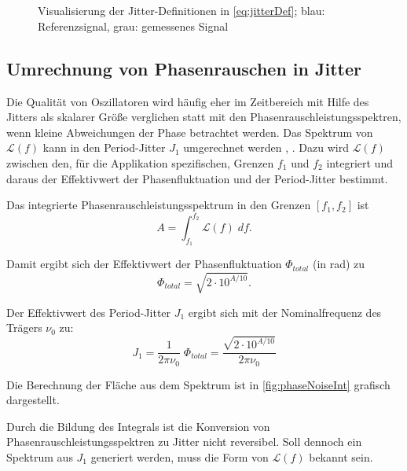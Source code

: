 \begin{figure}[H]
	\centering
	\\[4ex]
	\\[4ex]
	\caption[Jitterdefinitionen]{Visualisierung der Jitter-Definitionen in \autoref{eq:jitterDef}; blau: Referenzsignal, grau: gemessenes Signal}
	\label{fig:jitterDefs}
\end{figure}

\subsection{Umrechnung von Phasenrauschen in Jitter}
Die Qualität von Oszillatoren wird häufig eher im Zeitbereich mit Hilfe des Jitters als skalarer Größe verglichen statt mit den Phasenrauschleistungsspektren, wenn kleine Abweichungen der Phase betrachtet werden. Das Spektrum von $\mathscr{L}(f)$ kann in den Period-Jitter $J_1$ umgerechnet werden \cite{Kester2008}, \cite{Maxim2004}. Dazu wird $\mathscr{L}(f)$ zwischen den, für die Applikation spezifischen, Grenzen $f_1$ und $f_2$ integriert und daraus der Effektivwert der Phasenfluktuation und der Period-Jitter bestimmt.

Das integrierte Phasenrauschleistungsspektrum in den Grenzen $[f_1, f_2]$ ist
\begin{equation}
\label{eq:intPhaseNoise}
	A = \int_{f_1}^{f_2} \mathscr{L}(f) \; df.
\end{equation}

Damit ergibt sich der Effektivwert der Phasenfluktuation $\Phi_{total}$ (in rad) zu
\begin{equation}
	\Phi_{total} = \sqrt{2 \cdot 10^{A/10}}.
\end{equation}

Der Effektivwert des Period-Jitter $J_1$ ergibt sich mit der Nominalfrequenz des Trägers $\nu_0$ zu:
\begin{equation}
	J_1 = \frac{1}{2 \pi \nu_0} \; \Phi_{total} = \frac{\sqrt{2 \cdot 10^{A/10}}}{2 \pi \nu_0}
\end{equation}

Die Berechnung der Fläche aus dem Spektrum ist in \autoref{fig:phaseNoiseInt} grafisch dargestellt.

Durch die Bildung des Integrals ist die Konversion von Phasenrauschleistungsspektren zu Jitter nicht reversibel. Soll dennoch ein Spektrum aus $J_1$ generiert werden, muss die Form von $\mathscr{L}(f)$ bekannt sein. 

